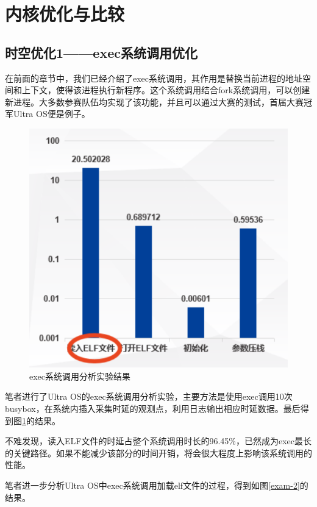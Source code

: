 \section{内核优化与比较}
\subsection{时空优化1——exec系统调用优化}

在前面的章节中，我们已经介绍了exec系统调用，其作用是替换当前进程的地址空间和上下文，使得该进程执行新程序。这个系统调用结合fork系统调用，可以创建新进程。大多数参赛队伍均实现了该功能，并且可以通过大赛的测试，首届大赛冠军Ultra OS便是例子。

\begin{figure}[htbp]
	\centering
	\includegraphics[scale=0.5]{figures/10-04/10-04-01.png}
	\caption{exec系统调用分析实验结果}
	\label{exam-1}
\end{figure} 

笔者进行了Ultra OS的exec系统调用分析实验，主要方法是使用exec调用10次busybox，在系统内插入采集时延的观测点，利用日志输出相应时延数据。最后得到图\ref{exam-1}的结果。


不难发现，读入ELF文件的时延占整个系统调用时长的96.45\%，已然成为exec最长的关键路径。如果不能减少该部分的时间开销，将会很大程度上影响该系统调用的性能。

笔者进一步分析Ultra OS中exec系统调用加载elf文件的过程，得到如图\ref{exam-2}的结果。

